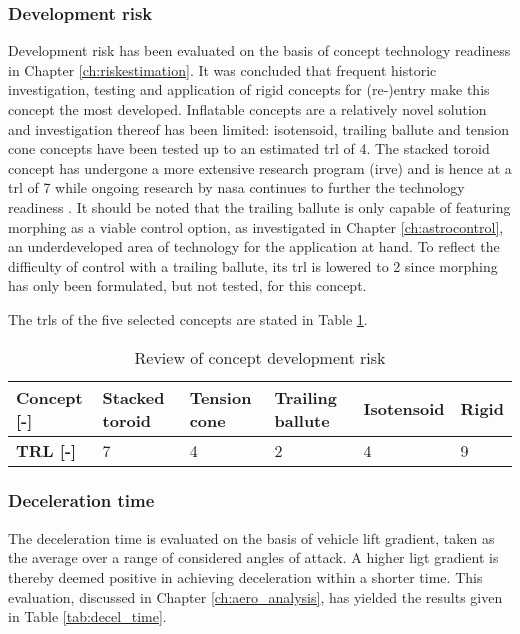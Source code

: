 \subsubsection{Development risk}
Development risk has been evaluated on the basis of concept technology readiness in Chapter \ref{ch:riskestimation}. It was concluded that frequent historic investigation, testing and application of rigid concepts for (re-)entry make this concept the most developed. Inflatable concepts are a relatively novel solution and investigation thereof has been limited: isotensoid, trailing ballute and tension cone concepts have been tested up to an estimated \gls{trl} of 4. The stacked toroid concept has undergone a more extensive research program (\acrfull{irve}) and is hence at a \gls{trl} of 7 while ongoing research by \gls{nasa} continues to further the technology readiness \cite{Dillman2014}. It should be noted that the trailing ballute is only capable of featuring morphing as a viable control option, as investigated in Chapter \ref{ch:astrocontrol}, an underdeveloped area of technology for the application at hand. To reflect the difficulty of control with a trailing ballute, its \gls{trl} is lowered to 2 since morphing has only been formulated, but not tested, for this concept.

The \glspl{trl} of the five selected concepts are stated in Table \ref{tab:gls_rev}.

\begin{table}[h]
\caption{Review of concept development risk}
\begin{tabular}{|l|l|l|l|l|l|}
\hline
\textbf{Concept {[}-{]}} & Stacked toroid & Tension cone & Trailing ballute & Isotensoid & Rigid \\ \hline
\textbf{TRL {[}-{]}}     &\cellcolor{green!70} 7  &\cellcolor{yellow!75}  4   &\cellcolor{red!60} 2 & \cellcolor{yellow!75}      4          &\cellcolor{green!70} 9     \\ \hline
\end{tabular}
\label{tab:gls_rev}
\end{table}

\subsubsection{Deceleration time}
The deceleration time is evaluated on the basis of vehicle lift gradient, taken as the average over a range of considered angles of attack. A higher ligt gradient is thereby deemed positive in achieving deceleration within a shorter time. This evaluation, discussed in Chapter \ref{ch:aero_analysis}, has yielded the results given in Table \ref{tab:decel_time}.

